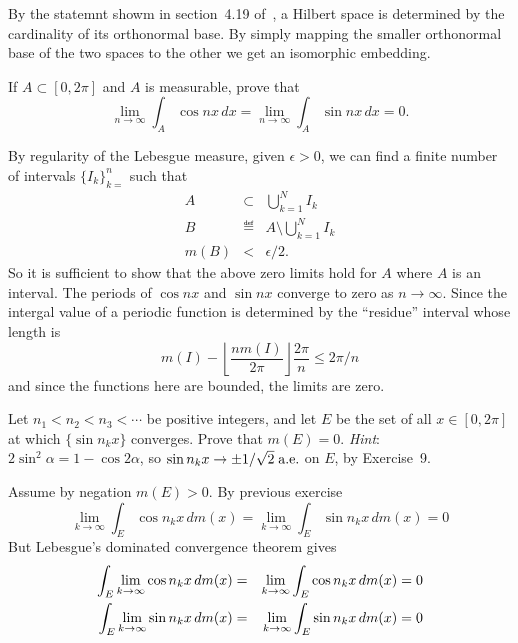 \begin{enumerate}
By the statemnt showm in section~4.19 of~\cite{RudinRCA87}, a Hilbert space
is determined by the cardinality of its orthonormal base.
By simply mapping the smaller orthonormal base of the two spaces
to the other we get an isomorphic embedding.

\begin{excopy}
If \(A\subset[0,2\pi]\) and $A$ is measurable, prove that
\begin{equation*}
 \lim_{n\to\infty} \int_A \cos nx\,dx
 =
 \lim_{n\to\infty} \int_A \sin nx\,dx
 = 0.
\end{equation*}
\end{excopy}

By regularity of the Lebesgue measure, given \(\epsilon > 0\),
we can find a finite number of intervals \(\{I_k\}_{k=}^n\)
such that
\begin{eqnarray*}
 A &\subset& \bigcup_{k=1}^N I_k \\
 B &\eqdef& A\setminus \bigcup_{k=1}^N I_k \\
 m(B) &<& \epsilon/2.
\end{eqnarray*}
So it is sufficient to show that the above zero limits hold
for $A$ where $A$ is an interval.
The periods of \(\cos nx\) and \(\sin nx\) converge to zero
as \(n\to\infty\). Since  the intergal value
of a periodic function is determined by the ``residue'' interval
whose length is
\begin{equation*}
m(I) - \left\lfloor \frac{n m(I)}{2\pi} \right\rfloor \frac{2\pi}{n}
\leq 2\pi/n
\end{equation*}
and since the functions here are bounded, the limits are zero.

\begin{excopy}
Let \(n_1 < n_2 < n_3 < \cdots\) be positive integers,
and let $E$ be the set of all \(x\in[0,2\pi]\) at which
\(\{\sin n_k x\}\) converges. Prove that \(m(E) = 0\).
\emph{Hint}: \(2\sin^2 \alpha = 1 - \cos 2\alpha\),
so \(\sin n_k x\to \pm 1/\sqrt{2}\;\textrm{a.e.}\) on $E$,
by Exercise~9.
\end{excopy}

Assume by negation \(m(E) > 0\).
By previous exercise
\begin{equation*}
   \lim_{k\to\infty} \int_E \cos n_k x\,dm(x)
 = \lim_{k\to\infty} \int_E \sin n_k x\,dm(x) = 0
\end{equation*}
But Lebesgue's dominated convergence theorem
gives
\begin{eqnarray}
 \int_E \lim_{k\to\infty} \cos n_k x\,dm(x)  \label{eq:ex4:10}
      &=& \lim_{k\to\infty} \int_E \cos n_k x\,dm(x) = 0 \\
 \int_E \lim_{k\to\infty} \sin n_k x\,dm(x)  \notag
      &=& \lim_{k\to\infty} \int_E \sin n_k x\,dm(x) = 0
\end{eqnarray}


\end{enumerate}
